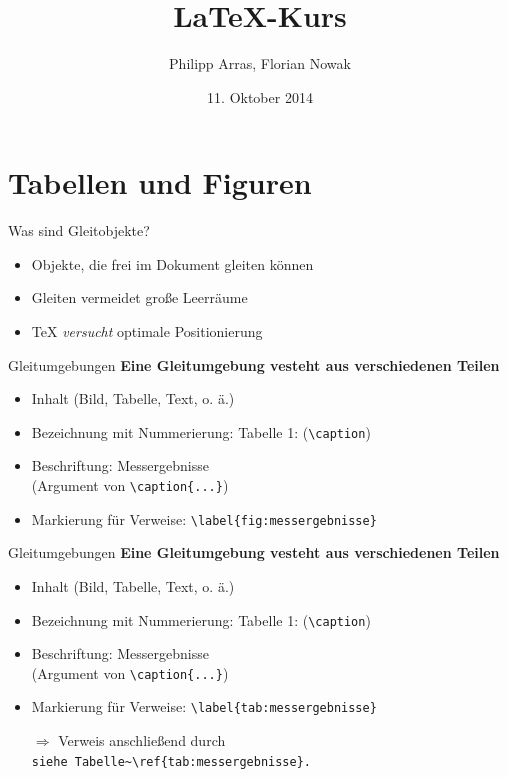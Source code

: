 \documentclass[11pt]{beamer}
\author{Philipp Arras, Florian Nowak}
\title{\LaTeX -Kurs}
\date{11. Oktober 2014}
\begin{document}


\section{Tabellen und Figuren}
\begin{frame}{Was sind Gleitobjekte?}
\begin{itemize}
\item Objekte, die frei im Dokument {\glqq}gleiten{\grqq} können
\item Gleiten vermeidet große Leerräume
\item {\TeX} \emph{versucht} optimale Positionierung
\end{itemize}
\end{frame}

\begin{frame}[fragile]{Gleitumgebungen}
\textbf{Eine Gleitumgebung vesteht aus verschiedenen Teilen}
\begin{itemize}
\item Inhalt (Bild, Tabelle, Text, o. ä.)
\item Bezeichnung mit Nummerierung: {\glqq}Tabelle 1:{\grqq} (\verb~\caption~)
\item Beschriftung: {\glqq}Messergebnisse{\grqq}\\
(Argument von \verb~\caption{...}~)
\item Markierung für Verweise: \verb~\label{fig:messergebnisse}~
\end{itemize}
\end{frame}

\begin{frame}[fragile]{Gleitumgebungen}
\textbf{Eine Gleitumgebung vesteht aus verschiedenen Teilen}
\begin{itemize}
\item Inhalt (Bild, Tabelle, Text, o. ä.)
\item Bezeichnung mit Nummerierung: {\glqq}Tabelle 1:{\grqq} (\verb~\caption~)
\item Beschriftung: {\glqq}Messergebnisse{\grqq}\\
(Argument von \verb~\caption{...}~)
\item Markierung für Verweise: \verb~\label{tab:messergebnisse}~
\item[$\Rightarrow$] Verweis anschließend durch\\
{\glqq}\verb!siehe Tabelle~\ref{tab:messergebnisse}.!{\grqq}
\end{itemize}
\end{frame}
\end{document}
